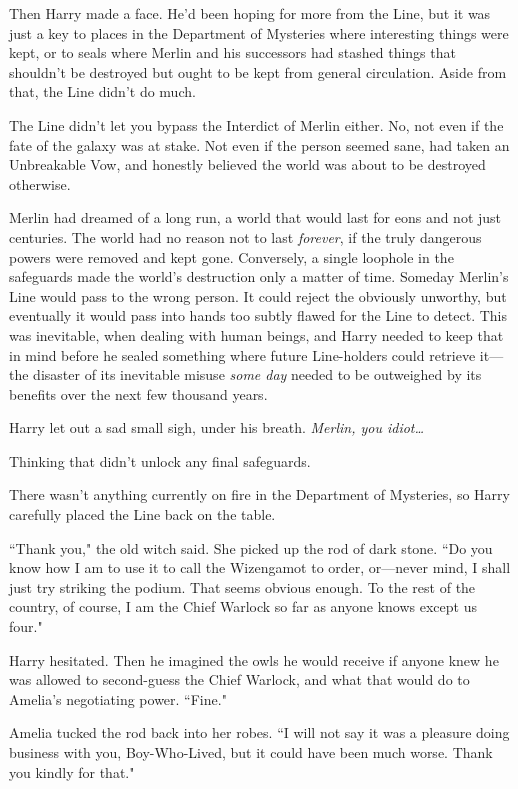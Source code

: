 Then Harry made a face. He'd been hoping for more from the Line, but it was just a key to places in the Department of Mysteries where interesting things were kept, or to seals where Merlin and his successors had stashed things that shouldn't be destroyed but ought to be kept from general circulation. Aside from that, the Line didn't do much.

The Line didn't let you bypass the Interdict of Merlin either. No, not even if the fate of the galaxy was at stake. Not even if the person seemed sane, had taken an Unbreakable Vow, and honestly believed the world was about to be destroyed otherwise.

Merlin had dreamed of a long run, a world that would last for eons and not just centuries. The world had no reason not to last \emph{forever}, if the truly dangerous powers were removed and kept gone. Conversely, a single loophole in the safeguards made the world's destruction only a matter of time. Someday Merlin's Line would pass to the wrong person. It could reject the obviously unworthy, but eventually it would pass into hands too subtly flawed for the Line to detect. This was inevitable, when dealing with human beings, and Harry needed to keep that in mind before he sealed something where future Line-holders could retrieve it---the disaster of its inevitable misuse \emph{some day} needed to be outweighed by its benefits over the next few thousand years.

Harry let out a sad small sigh, under his breath. \emph{Merlin, you idiot{\ldots}}

Thinking that didn't unlock any final safeguards.

There wasn't anything currently on fire in the Department of Mysteries, so Harry carefully placed the Line back on the table.

``Thank you," the old witch said. She picked up the rod of dark stone. ``Do you know how I am to use it to call the Wizengamot to order, or---never mind, I shall just try striking the podium. That seems obvious enough. To the rest of the country, of course, I am the Chief Warlock so far as anyone knows except us four."

Harry hesitated. Then he imagined the owls he would receive if anyone knew he was allowed to second-guess the Chief Warlock, and what that would do to Amelia's negotiating power. ``Fine."

Amelia tucked the rod back into her robes. ``I will not say it was a pleasure doing business with you, Boy-Who-Lived, but it could have been much worse. Thank you kindly for that."

